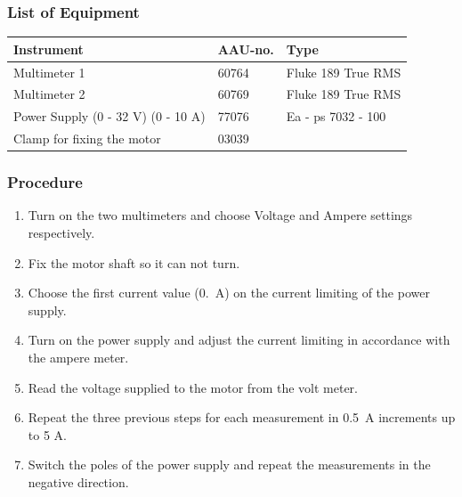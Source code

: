 \subsubsection{List of Equipment}                      %
\begin{table}[H]
\begin{tabular}{|l|l|p{4cm}|}
\hline%
  \textbf{Instrument}                        &  \textbf{AAU-no.}  &  \textbf{Type}       \\
\hline%
  Multimeter 1                               &  60764             &  Fluke 189 True RMS  \\
\hline%
  Multimeter 2                   		         &  60769             &  Fluke 189 True RMS  \\
\hline%
  Power Supply \small{(0 - 32 V) (0 - 10 A)} &  77076             &  Ea - ps 7032 - 100  \\
\hline%
  Clamp for fixing the motor                 &  03039             &                      \\
\hline%
\end{tabular}
\end{table}

\subsubsection{Procedure}

\begin{enumerate}
  \item Turn on the two multimeters and choose Voltage and Ampere settings respectively.
  \item Fix the motor shaft so it can not turn.
  \item Choose the first current value (\SI{0,}{A}) on the current limiting of the power supply.
  \item Turn on the power supply and adjust the current limiting in accordance with the ampere meter.
  \item Read the voltage supplied to the motor from the volt meter.
  \item Repeat the three previous steps for each measurement in \SI{0,5}{A} increments up to 5 A.
  \item Switch the poles of the power supply and repeat the measurements in the negative direction.
\end{enumerate}

